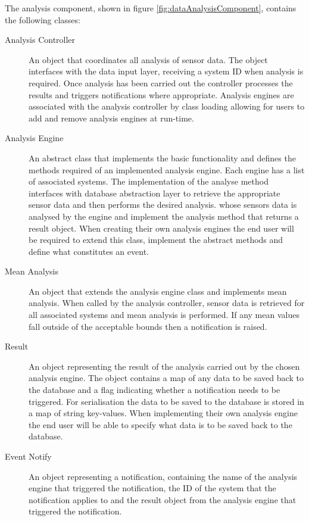 \documentclass[10pt,a4paper]{article}
\begin{document}
The analysis component, shown in figure \ref{fig:dataAnalysisComponent}, contains the following classes:
\begin{description}
\item [Analysis Controller] An object that coordinates all analysis of sensor data. The object interfaces with the data input layer, receiving a system ID when analysis is required. Once analysis has been carried out the controller processes the results and triggers notifications where appropriate. Analysis engines are associated with the analysis controller by class loading allowing for users to add and remove analysis engines at run-time.
\item [Analysis Engine] An abstract class that implements the basic functionality and defines the methods required of an implemented analysis engine. Each engine has a list of associated systems. The implementation of the analyse method interfaces with database abstraction layer to retrieve the appropriate sensor data and then performs the desired analysis. whose sensors data is analysed by the engine and implement the analysis method that returns a result object. When creating their own analysis engines the end user will be required to extend this class, implement the abstract methods and define what constitutes an event.
\item [Mean Analysis] An object that extends the analysis engine class and implements mean analysis. When called by the analysis controller, sensor data is retrieved for all associated systems and mean analysis is performed. If any mean values fall outside of the acceptable bounds then a notification is raised.
\item [Result] An object representing the result of the analysis carried out by the chosen analysis engine. The object contains a map of any data to be saved back to the database and a flag indicating whether a notification needs to be triggered. For serialisation the data to be saved to the database is stored in a map of string key-values. When implementing their own analysis engine the end user will be able to specify what data is to be saved back to the database.
\item [Event Notify] An object representing a notification, containing the name of the analysis engine that triggered the notification, the ID of the system that the notification applies to and the result object from the analysis engine that triggered the notification.
\end{description}
\end{document}
